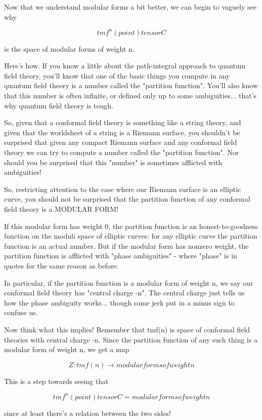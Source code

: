 Now that we understand modular forms a bit better, we can
begin to vaguely see why 

$$
tmf^{n}(point) tensor C
$$
    
is the space of modular forms of weight n. 

Here's how.  If you know a little about the path-integral approach
to quantum field theory, you'll know that one of the basic things
you compute in any quantum field theory is a number called the
"partition function".  You'll also know that this number is often
infinite, or defined only up to some ambiguities... that's why
quantum field theory is tough.  

So, given that a conformal field theory is something like a string 
theory, and given that the worldsheet of a string is a Riemann 
surface, you shouldn't be surprised that given any compact Riemann 
surface and any conformal field theory we can try to compute a 
number called the "partition function".  Nor should you be surprised 
that this "number" is sometimes afflicted with ambiguities!  

So, restricting attention to the case where our Riemann surface
is an elliptic curve, you should not be surprised that the 
partition function of any conformal field theory is a MODULAR FORM!  

If this modular form has weight 0, the partition function is an 
honest-to-goodness function on the moduli space of elliptic curves: 
for any elliptic curve the partition function is an actual number.  
But if the modular form has nonzero weight, the partition function 
is afflicted with "phase ambiguities" - where "phase" 
is in quotes for the same reason as before.  

In particular, if the partition function is a modular form
of weight n, we say our conformal field theory has "central
charge -n".  The central charge just tells us how the phase
ambiguity works... though some jerk put in a minus sign to confuse us.  

Now think what this implies!   Remember that tmf(n) is space 
of conformal field theories with central charge -n.  Since
the partition function of any such thing is a modular form of
weight n, we get a map

$$
Z: tmf(n) \to  {modular forms of weight n}
$$
    
This is a step towards seeing that 

$$
tmf^{n}(point) tensor C = {modular forms of weight n} 
$$
    
since at least there's a relation between the two sides!

